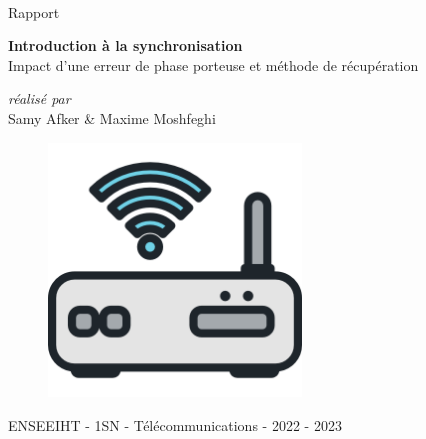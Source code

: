 \documentclass[11pt,a4paper]{report}
\begin{document}
 
\begin{titlepage} 
\centering
\vspace{2.5cm}
\huge
\\ Rapport \\
\vspace{1cm}
\begin{center}
\textbf{Introduction à la synchronisation} \\ Impact d’une erreur de phase porteuse et méthode de récupération
\end{center}

\vspace{1cm}
\large \textit{réalisé par}\\
\vspace{0.2cm}
\Large Samy Afker \& Maxime Moshfeghi\\


\begin{figure}[ht]
    \centering
    \includegraphics[width=0.6\textwidth]{modem.png}
    \label{fig:Routeur}  
\end{figure}

\vspace{2cm}
ENSEEIHT - 1SN - Télécommunications -
\vspace{0.5cm}
2022 - 2023

\end{titlepage}
\end{document}
